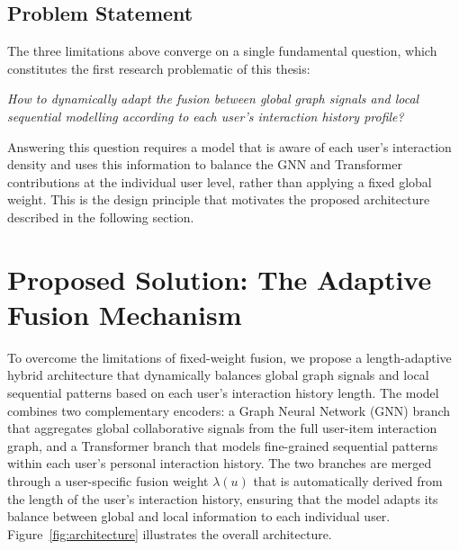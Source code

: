 \documentclass[12pt,a4paper]{report}
\begin{document}
\subsection*{Problem Statement}

\justifying
The three limitations above converge on a single fundamental question, which
constitutes the first research problematic of this thesis:

\textit{How to dynamically adapt the fusion between global graph signals and
local sequential modelling according to each user's interaction history
profile?}

Answering this question requires a model that is aware of each user's
interaction density and uses this information to balance the GNN and
Transformer contributions at the individual user level, rather than applying
a fixed global weight. This is the design principle that motivates the
proposed architecture described in the following section.


\section{Proposed Solution: The Adaptive Fusion Mechanism}
\label{sec:solution}

\justifying
To overcome the limitations of fixed-weight fusion, we propose a length-adaptive
hybrid architecture that dynamically balances global graph signals and local
sequential patterns based on each user's interaction history length. The model
combines two complementary encoders: a Graph Neural Network (GNN) branch that
aggregates global collaborative signals from the full user-item interaction
graph, and a Transformer branch that models fine-grained sequential patterns
within each user's personal interaction history. The two branches are merged
through a user-specific fusion weight \(\lambda(u)\) that is automatically
derived from the length of the user's interaction history, ensuring that the
model adapts its balance between global and local information to each individual
user. Figure~\ref{fig:architecture} illustrates the overall architecture.

\end{document}
